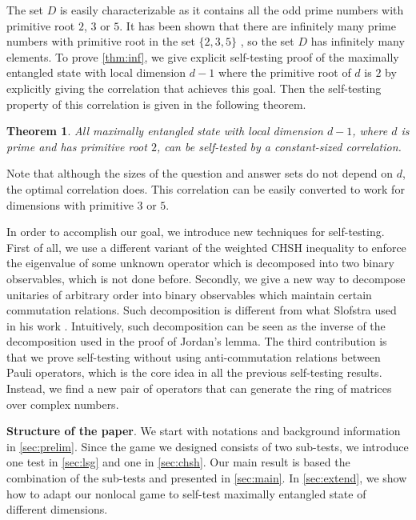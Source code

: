 \documentclass[11pt,letterpaper]{article}
\newcommand{\1}{\mathbb{1}}
\newtheorem{theorem}{Theorem}
\theoremstyle{definition}
\begin{document}
The set $D$ is easily characterizable as it contains all the odd prime numbers with 
primitive root $2$, $3$ or $5$. It has been shown that there are infinitely many prime numbers
with primitive root in the set $\{2,3,5\}$ \cite{murty1988}, so the set $D$ has infinitely many elements.
To prove \cref{thm:inf}, we give explicit self-testing proof of 
the maximally entangled state with local dimension $d-1$ where the primitive root of $d$ is $2$ by explicitly giving the 
correlation that achieves this goal. Then the self-testing property of this correlation is 
given in the following theorem.
\begin{theorem}
\label{thm:pr_2}
	All maximally entangled state with local dimension $d-1$, where $d$ is prime and has
	primitive root $2$, can be self-tested by a constant-sized correlation.
\end{theorem}
Note that although the sizes of the question and answer
sets do not depend on $d$, the optimal correlation does.
This correlation can be easily converted to work for dimensions with primitive $3$ or $5$.

In order to accomplish our goal, we introduce new techniques for self-testing.
First of all, we use a different variant of the weighted CHSH inequality to enforce the eigenvalue of
some unknown operator which is decomposed into two binary observables, which is not done before.
Secondly, we give a new way to decompose unitaries of arbitrary order into binary observables which maintain
certain commutation relations. Such decomposition is different from what Slofstra used in his work \cite{slofstra2017}.
Intuitively, such decomposition can be seen as the inverse of the decomposition used in the proof of Jordan's lemma.
The third contribution is that we prove self-testing without using anti-commutation relations between Pauli operators, 
which is the core idea in all the previous self-testing results. 
Instead, we find a new pair of operators that can generate the ring of matrices over complex numbers.


\textbf{Structure of the paper}.
We start with notations and background information in \cref{sec:prelim}.
Since the game we designed consists of two sub-tests, we introduce one test
in \cref{sec:lsg} and one in \cref{sec:chsh}. Our main result is based the combination
of the sub-tests and presented in \cref{sec:main}. In \cref{sec:extend}, we show how to adapt
our nonlocal game to self-test maximally entangled state of different dimensions.

\end{document}
